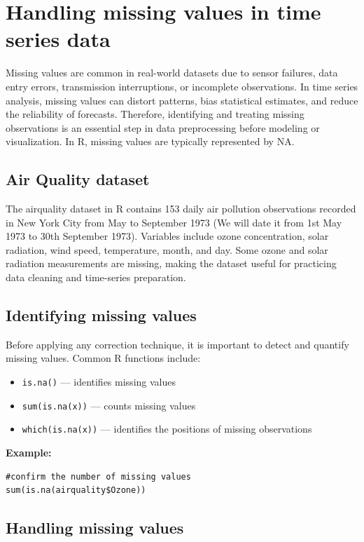 \documentclass[12pt,a4paper]{article}
\begin{document}
\section{Handling missing values in time series data}

Missing values are common in real-world datasets due to sensor failures, data entry errors, transmission interruptions, or incomplete observations. In time series analysis, missing values can distort patterns, bias statistical estimates, and reduce the reliability of forecasts. Therefore, identifying and treating missing observations is an essential step in data preprocessing before modeling or visualization. In R, missing values are typically represented by NA.

\subsection{Air Quality dataset}

The airquality dataset in R contains 153 daily air pollution observations recorded in New York City from May to September 1973 (We will date it from 1st May 1973 to 30th September 1973). Variables include ozone concentration, solar radiation, wind speed, temperature, month, and day. Some ozone and solar radiation measurements are missing, making the dataset useful for practicing data cleaning and time-series preparation.

\subsection{Identifying missing values}

Before applying any correction technique, it is important to detect and quantify missing values. Common R functions include:

\begin{itemize}
    \item \texttt{is.na()} — identifies missing values
    \item \texttt{sum(is.na(x))} — counts missing values
    \item \texttt{which(is.na(x))} — identifies the positions of missing observations
\end{itemize}

\textbf{Example:}
\begin{verbatim}
#confirm the number of missing values
sum(is.na(airquality$Ozone))
\end{verbatim}

\subsection{Handling missing values}
\end{document}

